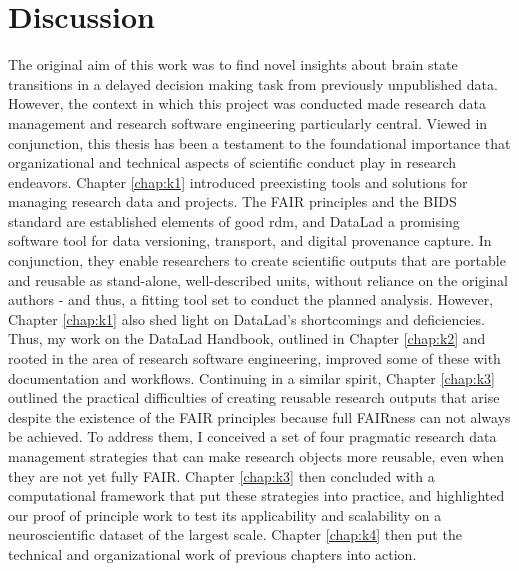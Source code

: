 

\chapter{Discussion}
\label{discussion}

The original aim of this work was to find novel insights about brain state transitions in a delayed decision making task from previously unpublished data.
However, the context in which this project was conducted made research data management and research software engineering particularly central.
Viewed in conjunction, this thesis has been a testament to the foundational importance that organizational and technical aspects of scientific conduct play in research endeavors.
Chapter \ref{chap:k1} introduced preexisting tools and solutions for managing research data and projects.
The \gls{FAIR} principles and the \gls{BIDS} standard are established elements of good \gls{rdm}, and DataLad a promising software tool for data versioning, transport, and digital provenance capture.
In conjunction, they enable researchers to create scientific outputs that are portable and reusable as stand-alone, well-described units, without reliance on the original authors - and thus, a fitting tool set to conduct the planned analysis.
However, Chapter \ref{chap:k1} also shed light on DataLad's shortcomings and deficiencies.
Thus, my work on the DataLad Handbook, outlined in Chapter \ref{chap:k2} and rooted in the area of research software engineering, improved some of these with documentation and workflows.
Continuing in a similar spirit, Chapter \ref{chap:k3} outlined the practical difficulties of creating reusable research outputs that arise despite the existence of the \gls{FAIR} principles because full FAIRness can not always be achieved.
To address them, I conceived a set of four pragmatic research data management strategies that can make research objects more reusable, even when they are not yet fully \gls{FAIR}.
Chapter \ref{chap:k3} then concluded with a computational framework that put these strategies into practice, and highlighted our proof of principle work to test its applicability and scalability on a neuroscientific dataset of the largest scale.
Chapter \ref{chap:k4} then put the technical and organizational work of previous chapters into action.


